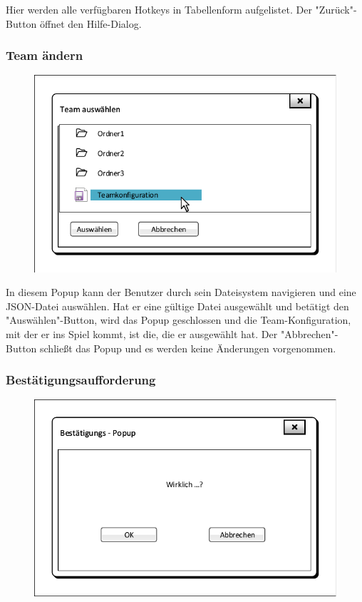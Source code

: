Hier werden alle verfügbaren Hotkeys in Tabellenform aufgelistet. Der "Zurück"-Button öffnet den Hilfe-Dialog.

\subsubsection{Team ändern}
\begin{figure}[H]
	\centering
	\includegraphics[scale=0.8]{images/Teamauswahl_Popup.pdf}
\end{figure}

In diesem Popup kann der Benutzer durch sein Dateisystem navigieren und eine JSON-Datei auswählen. Hat er eine gültige Datei ausgewählt und betätigt den "Auswählen"-Button, wird das Popup geschlossen und die Team-Konfiguration, mit der er ins Spiel kommt, ist die, die er ausgewählt hat. Der "Abbrechen"-Button schließt das Popup und es werden keine Änderungen vorgenommen.

\subsubsection{Bestätigungsaufforderung}
\begin{figure}[H]
	\centering
	\includegraphics[scale=0.8]{images/OK_Popup.pdf}
\end{figure}

